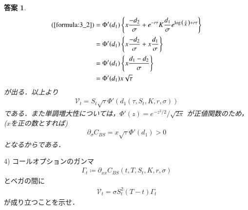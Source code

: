 \documentclass[11pt,a4paper]{jsarticle}
\theoremstyle{mystyle}
\newtheorem*{ans}{答案}
\begin{document}
\begin{ans}
\begin{align}
		(\refeq{formula:3_2}) &= 
		\Phi'(d_{1}) \left\{x\frac{-d_{2}}{\sigma} + e^{-r\tau}K\frac{d_{1}}{\sigma}e^{\log{\left(\frac{x}{K}\right)}+r\tau}\right\} \\
		&= \Phi'(d_{1}) \left\{x\frac{-d_{2}}{\sigma} + x\frac{d_{1}}{\sigma}\right\} \\
		&= \Phi'(d_{1}) \left\{x \frac{d_{1}-d_{2}}{\sigma}\right\} \\
		&= \Phi'(d_{1}) x \sqrt{\tau}
	\end{align}
	が出る．以上より
	\begin{align}
		\mathcal{V}_{t} = S_{t} \sqrt{\tau} \Phi'(d_{1}(\tau,S_{t},K,r,\sigma))
		\label{formula:3_4}
	\end{align}
	である．また単調増大性については，$\Phi'(z) = e^{-z^{2}/2}/\sqrt{2\pi}$
	が正値関数のため，($x$を正の数とすれば)
	\begin{align}
		\partial_{\sigma}C_{BS} = x \sqrt{\tau} \Phi'(d_{1}) > 0
	\end{align}
	となるからである．
\end{ans}

\begin{itembox}[l]{4)}
	コールオプションのガンマ
	\begin{align}
		\Gamma_{t} \coloneqq \partial_{xx}C_{BS}(t,T,S_{t},K,r,\sigma)
	\end{align}
	とベガの間に
	\begin{align}
		\mathcal{V}_{t} = \sigma S_{t}^{2}(T-t)\Gamma_{t}
	\end{align}
	が成り立つことを示せ．
\end{itembox}
\end{document}
